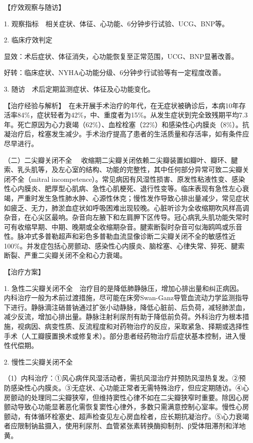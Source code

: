 【疗效观察与随访】

1. 观察指标　相关症状、体征、心功能、6分钟步行试验、UCG、BNP等。

2. 临床疗效判定

显效：术后症状、体征消失，心功能恢复至正常范围，UCG、BNP显著改善。

好转：临床症状、NYHA心功能分级、6分钟步行试验等有一定程度改善。

3. 随访　术后定期监测症状、体征及心功能变化。

【治疗经验与解析】　在未开展手术治疗的年代，在无症状被确诊后，本病10年存活率84\%，症状轻者为42\%，中、重度者为15\%。从发生症状到完全致残期平均7.3年。死亡原因为心力衰竭（62\%）、血栓栓塞（22\%）和感染性心内膜炎（8\%）。抗凝治疗后，栓塞发生减少。手术治疗提高了患者的生活质量和存活率，如有条件应尽早进行。

{（二）二尖瓣关闭不全}
　收缩期二尖瓣关闭依赖二尖瓣装置如瓣叶、瓣环、腱索、乳头肌等，及左心室的结构、功能的完整性，其中任何部分异常可致二尖瓣关闭不全（mitral
incompetence）。常见病因有风湿性损害、原发性粘液性变、感染性心内膜炎、肥厚型心肌病、急性心肌梗死、退行性变等。临床表现有急性左心衰竭，严重时发生急性肺水肿、心源性休克；慢性发作导致心排出量减少，常见症状如疲乏、无力，肺淤血症状如呼吸困难出现较晚。心脏听诊为全收缩期吹风样高调杂音，在心尖区最响。杂音向左腋下和左肩胛下区传导。冠心病乳头肌功能失常时可有收缩早期、中期、晚期或全收缩期杂音。腱索断裂时杂音可似海鸥鸣或乐音性。脉冲式多普勒超声和彩色多普勒血流显像诊断二尖瓣关闭不全的敏感性近100\%。并发症包括心房颤动、感染性心内膜炎、脑栓塞、心律失常、猝死、腱索断裂、严重二尖瓣关闭不全和心力衰竭。

【治疗方案】

1.
急性二尖瓣关闭不全　治疗目的是降低肺静脉压，增加心排出量和纠正病因。内科治疗一般为术前过渡措施，尽可能在床旁Swan-Ganz导管血流动力学监测指导下进行。静脉滴注硝普钠通过扩张小动静脉，降低心脏前、后负荷，减轻肺淤血，减少反流，增加心排出量。静脉注射利尿剂有助于降低前负荷。外科治疗为根本措施，视病因、病变性质、反流程度和对药物治疗的反应，采取紧急、择期或选择性手术（人工瓣膜置换术或修复术）。部分患者经药物治疗后症状基本控制，进入慢性代偿期。

2. 慢性二尖瓣关闭不全

（1）内科治疗：①风心病伴风湿活动者，需抗风湿治疗并预防风湿热复发。②预防感染性心内膜炎。③无症状、心功能正常者无需特殊治疗，但应定期随访。④心房颤动的处理同二尖瓣狭窄，但维持窦性心律不如在二尖瓣狭窄时重要。除因心房颤动导致心功能显著恶化需恢复窦性心律外，多数只需满意控制心室率。慢性心房颤动，有体循环栓塞史、超声检查见左心房血栓者，应长期抗凝治疗。⑤心力衰竭者应限制钠盐摄入，使用利尿剂、血管紧张素转换酶抑制剂、β受体阻滞剂和洋地黄。


